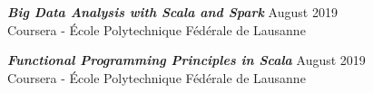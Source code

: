 \documentclass[margin, 10pt]{res} %
\begin{document}
\begin{resume}
{\sl \bf Big Data Analysis with Scala and Spark} \hfill  August 2019 \\
Coursera - École Polytechnique Fédérale de Lausanne

{\sl \bf Functional Programming Principles in Scala} \hfill  August 2019 \\
Coursera - École Polytechnique Fédérale de Lausanne





\end{resume}
\end{document}
